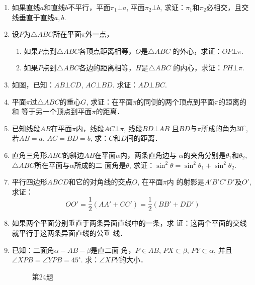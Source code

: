\begin{enumerate}
\item 如果直线$a$和直线$b$不平行，平面$\pi_1\bot a$, 平面$\pi_2\bot b$, 
求证：$\pi_1$和$\pi_2$必相交，且交线垂直于直线$a,b$.
\item 设$P$为$\triangle ABC$所在平面$\pi$外一点，
\begin{enumerate}
  \item 如果$P$点到$\triangle ABC$各顶点距离相等，$O$是$\triangle ABC$
的外心，求证：$OP\bot\pi$.
\item 如果$P$点到$\triangle ABC$各边的距离相等，$H$是$\triangle ABC$
的内心，求证：$PH\bot\pi$.
\end{enumerate}
\item 如图，已知：$AB\bot CD$, $AC\bot BD$. 
求证：$AD\bot BC$.
\item 平面$\pi$过$\triangle ABC$的重心$G$, 
求证：在平面$\pi$的同侧的两个顶点到平面$\pi$的距离的和
等于另一个顶点到平面$\pi$的距离．
\item 已知线段$AB$在平面$\pi$内，线段$AC\bot \pi$, 线段$BD\bot AB$
且$BD$与$\pi$所成的角为$30^{\circ}$, 若$AB=a$, $AC=BD=b$, 
求：$C$和$D$间的距离．
\item 直角三角形$ABC$的斜边$AB$在平面$\alpha$内，两条直角边与
$\alpha$的夹角分别是$\theta_1$和$\theta_2$, $\triangle ABC$所在平面与$\alpha$所成的二
面角是$\theta$, 求证：$\sin^2\theta=\sin^2\theta_1+\sin^2\theta_2$.
\item 平行四边形$ABCD$和它的对角线的交点$O$, 在平面$\pi$内
的射影是$A'B'C'D'$及$O'$, 求证：
\[OO'=\frac{1}{2}(AA'+CC')= \frac{1}{2}(BB'+DD')\]
\item 如果两个平面分别垂直于两条异面直线中的一条，求
证：这两个平面的交线就平行于这两条异面直线的公垂
线．
\item 已知：二面角$\alpha-AB-\beta$是直二面
角，$P\in AB$, $PX\subset \beta$, $PY\subset \alpha$, 并且
$\angle XPB=\angle YPB=45^{\circ}$. 
求：$\angle XPY$的大小．
\begin{figure}[htp]
  \centering
{}
  \caption*{第24题}
\end{figure}
























\end{enumerate}